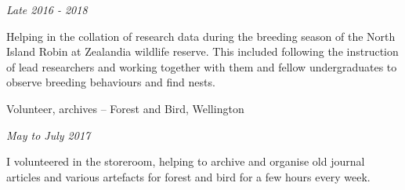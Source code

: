 \documentclass[11pt,a4paper,]{moderncv}
\begin{document}
\emph{Late 2016 - 2018}

Helping in the collation of research data during the breeding season of
the North Island Robin at Zealandia wildlife reserve. This included
following the instruction of lead researchers and working together with
them and fellow undergraduates to observe breeding behaviours and find
nests.

Volunteer, archives -- Forest and Bird, Wellington ~

\emph{May to July 2017}

I volunteered in the storeroom, helping to archive and organise old
journal articles and various artefacts for forest and bird for a few
hours every week.
\end{document}
